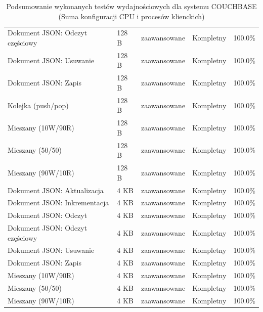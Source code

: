 \begin{table}[ht]
{\begin{tabular}{lllcc}
Dokument JSON: Odczyt częściowy & 128 B & zaawansowane & Kompletny & 100.0\% \\
Dokument JSON: Usuwanie & 128 B & zaawansowane & Kompletny & 100.0\% \\
Dokument JSON: Zapis & 128 B & zaawansowane & Kompletny & 100.0\% \\
Kolejka (push/pop) & 128 B & zaawansowane & Kompletny & 100.0\% \\
Mieszany (10W/90R) & 128 B & zaawansowane & Kompletny & 100.0\% \\
Mieszany (50/50) & 128 B & zaawansowane & Kompletny & 100.0\% \\
Mieszany (90W/10R) & 128 B & zaawansowane & Kompletny & 100.0\% \\
Dokument JSON: Aktualizacja & 4 KB & zaawansowane & Kompletny & 100.0\% \\
Dokument JSON: Inkrementacja & 4 KB & zaawansowane & Kompletny & 100.0\% \\
Dokument JSON: Odczyt & 4 KB & zaawansowane & Kompletny & 100.0\% \\
Dokument JSON: Odczyt częściowy & 4 KB & zaawansowane & Kompletny & 100.0\% \\
Dokument JSON: Usuwanie & 4 KB & zaawansowane & Kompletny & 100.0\% \\
Dokument JSON: Zapis & 4 KB & zaawansowane & Kompletny & 100.0\% \\
Mieszany (10W/90R) & 4 KB & zaawansowane & Kompletny & 100.0\% \\
Mieszany (50/50) & 4 KB & zaawansowane & Kompletny & 100.0\% \\
Mieszany (90W/10R) & 4 KB & zaawansowane & Kompletny & 100.0\% \\
\bottomrule
\end{tabular}%
}
\caption{Podsumowanie wykonanych testów wydajnościowych dla systemu COUCHBASE (Suma konfiguracji CPU i procesów klienckich)}
\label{tab:executed_tests_couchbase}
\end{table}
